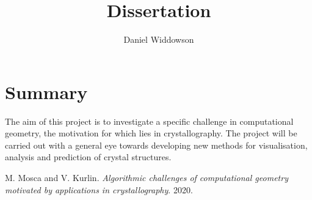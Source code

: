 \documentclass[11pt]{article}
\title{Dissertation}
\author{Daniel Widdowson}
\begin{document}
\maketitle

\section{Summary}

The aim of this project is to investigate a specific challenge in computational geometry, the motivation for which lies in crystallography. The project will be carried out with a general eye towards developing new methods for visualisation, analysis and prediction of crystal structures. 

\begin{thebibliography}{9}
M. Mosca and V. Kurlin. \emph{Algorithmic challenges of computational geometry motivated by applications in crystallography}. 2020.
\end{thebibliography}

 
\end{document}
